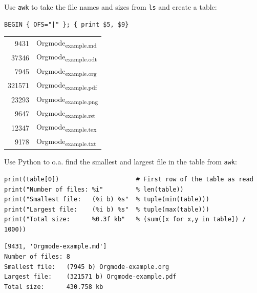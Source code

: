 \documentclass[11pt]{article}
\begin{document}
\begin{enumerate}
Use \texttt{awk} to take the file names and sizes from \texttt{ls} and create a table:
\begin{verbatim}
BEGIN { OFS="|" }; { print $5, $9}
\end{verbatim}

\begin{center}
\begin{tabular}{rl}
9431 & Orgmode\textsubscript{example.md}\\
37346 & Orgmode\textsubscript{example.odt}\\
7945 & Orgmode\textsubscript{example.org}\\
321571 & Orgmode\textsubscript{example.pdf}\\
23293 & Orgmode\textsubscript{example.png}\\
9647 & Orgmode\textsubscript{example.rst}\\
12347 & Orgmode\textsubscript{example.tex}\\
9178 & Orgmode\textsubscript{example.txt}\\
\end{tabular}
\end{center}

Use Python to o.a. find the smallest and largest file in the table from \texttt{awk}:
\begin{verbatim}
print(table[0])                     # First row of the table as read
print("Number of files: %i"         % len(table))
print("Smallest file:   (%i b) %s"  % tuple(min(table)))
print("Largest file:    (%i b) %s"  % tuple(max(table)))
print("Total size:      %0.3f kb"   % (sum([x for x,y in table]) / 1000))
\end{verbatim}

\begin{verbatim}
[9431, 'Orgmode-example.md']
Number of files: 8
Smallest file:   (7945 b) Orgmode-example.org
Largest file:    (321571 b) Orgmode-example.pdf
Total size:      430.758 kb
\end{verbatim}
\end{enumerate}
\end{document}
